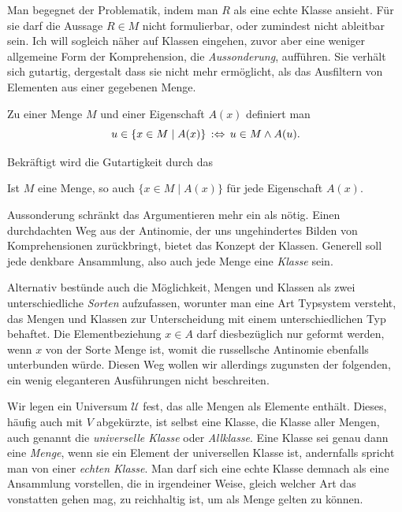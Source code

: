 Man begegnet der Problematik, indem man $R$ als eine echte
Klasse ansieht. Für sie darf die Aussage $R\in M$ nicht formulierbar, oder
zumindest nicht ableitbar sein. Ich will sogleich näher auf
Klassen eingehen, zuvor aber eine weniger allgemeine Form der Komprehension,
die \emph{Aussonderung}, aufführen. Sie verhält sich
gutartig, dergestalt dass sie nicht mehr ermöglicht, als das Ausfiltern
von Elementen aus einer gegebenen Menge.

\begin{Definition}[Aussonderung]%
\label{def:Aussonderung}\newlinefirst
Zu einer Menge $M$ und einer Eigenschaft $A(x)$ definiert man
\[u\in\{x\in M\mid A(x)\}\,:\Leftrightarrow\, u\in M\land A(u).\]
\end{Definition}

\noindent
Bekräftigt wird die Gutartigkeit durch das

\begin{Axiom}\newlinefirst
Ist $M$ eine Menge, so auch $\{x\in M\mid A(x)\}$ für jede Eigenschaft $A(x)$.
\end{Axiom}

\noindent
Aussonderung schränkt das Argumentieren mehr ein als nötig. Einen
durchdachten Weg aus der Antinomie, der uns ungehindertes Bilden von
Komprehensionen zurückbringt, bietet das Konzept der Klassen.
Generell soll jede denkbare Ansammlung, also auch jede Menge eine
\emph{Klasse} sein.

Alternativ bestünde auch die Möglichkeit, Mengen und Klassen als zwei
unterschiedliche \emph{Sorten} aufzufassen, worunter man eine Art
Typsystem versteht, das Mengen und Klassen zur Unterscheidung mit einem
unterschiedlichen Typ behaftet. Die Elementbeziehung $x \in A$
darf diesbezüglich nur geformt werden, wenn $x$ von der Sorte Menge ist,
womit die russellsche Antinomie ebenfalls unterbunden würde. Diesen Weg
wollen wir allerdings zugunsten der folgenden, ein wenig eleganteren
Ausführungen nicht beschreiten.

Wir legen ein Universum $\mathcal U$ fest, das alle Mengen als Elemente
enthält. Dieses, häufig auch mit $V$ abgekürzte, ist selbst
eine Klasse, die Klasse aller Mengen, auch genannt die \emph{universelle
Klasse} oder \emph{Allklasse}. Eine Klasse sei genau dann eine
\emph{Menge}, wenn sie ein Element der universellen Klasse ist,
andernfalls spricht man von einer \emph{echten Klasse}. Man darf sich
eine echte Klasse demnach als eine Ansammlung vorstellen, die in
irgendeiner Weise, gleich welcher Art das vonstatten gehen mag, zu
reichhaltig ist, um als Menge gelten zu können.

